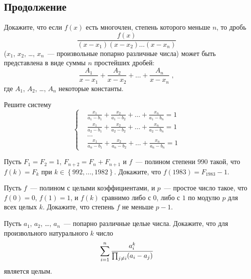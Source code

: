 \subsection*{Продолжение}

\begin{problems}

\item
Докажите, что если $f(x)$ есть многочлен, степень которого меньше $n$, то дробь
\[
    \frac{f(x)}{(x - x_1) (x - x_2) \ldots (x - x_n)}
\]
($x_1$, $x_2$, \ldots, $x_n$~--- произвольные попарно различные числа)
может быть представлена в виде суммы $n$ простейших дробей:
\[
    \frac{A_1}{x - x_1} + \frac{A_2}{x - x_2} + \ldots + \frac{A_n}{x - x_n}
\;,\]
где $A_1$, $A_2$, \ldots, $A_n$ некоторые константы.

\item
Решите систему
\[ \left\{ \begin{aligned} &
    \frac{x_1}{a_1 - b_1} + \frac{x_2}{a_1 - b_2}
    + \ldots +
    \frac{x_n}{a_1 - b_n}
=
    1
\\ &
    \frac{x_1}{a_2 - b_1} + \frac{x_2}{a_2 - b_2}
    + \ldots +
    \frac{x_n}{a_2 - b_n}
=
    1
\\ & \ldots \\ &
    \frac{x_1}{a_n - b_1} + \frac{x_2}{a_n - b_2}
    + \ldots +
    \frac{x_n}{a_n - b_n}
=
    1
\end{aligned} \right. \]

\item
Пусть $F_1 = F_2 = 1$, $F_{n+2} = F_n + F_{n+1}$ и $f$~--- полином степени
$990$ такой, что $f(k) = F_k$ при $k \in \left\{992, \ldots, 1982\right\}$.
Докажите, что $f(1983) = F_{1983} - 1$.

\item
Пусть $f$~--- полином с целыми коэффициентами, и $p$~--- простое число такое,
что $f(0) = 0$, $f(1) = 1$, и $f(k)$ сравнимо либо с $0$, либо с $1$ по модулю
$p$ для всех целых $k$.
Докажите, что степень $f$ не меньше $p - 1$.

\item
Пусть $a_1$, $a_2$, \ldots, $a_n$~--- попарно различные целые числа.
Докажите, что для произвольного натурального $k$ число
\[
    \sum_{i=1}^{n}
        \cfrac{a_i^k}{
            \prod_{j \neq i}
                (a_i - a_j)
        }
\]
является целым.

\end{problems}

